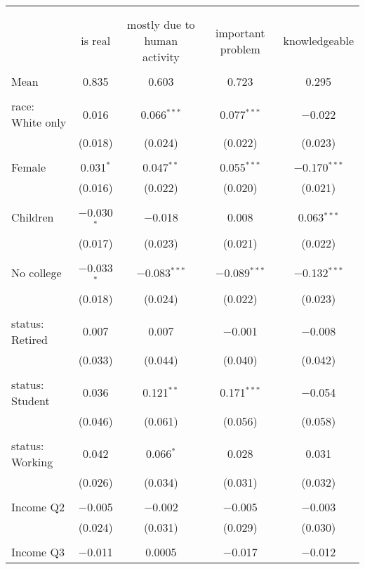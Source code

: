 
\begin{tabular}{@{\extracolsep{5pt}}lcccc} 
\\[-1.8ex]\hline 
\hline \\[-1.8ex] 
\\[-1.8ex] & is real & mostly due to human activity & important problem & knowledgeable \\ 
\hline \\[-1.8ex] 
 Mean & 0.835 & 0.603 & 0.723 & 0.295  \\ \hline \\[-1.8ex] race: White only & 0.016 & 0.066$^{***}$ & 0.077$^{***}$ & $-$0.022 \\ 
  & (0.018) & (0.024) & (0.022) & (0.023) \\ 
  & & & & \\ 
 Female & 0.031$^{*}$ & 0.047$^{**}$ & 0.055$^{***}$ & $-$0.170$^{***}$ \\ 
  & (0.016) & (0.022) & (0.020) & (0.021) \\ 
  & & & & \\ 
 Children & $-$0.030$^{*}$ & $-$0.018 & 0.008 & 0.063$^{***}$ \\ 
  & (0.017) & (0.023) & (0.021) & (0.022) \\ 
  & & & & \\ 
 No college & $-$0.033$^{*}$ & $-$0.083$^{***}$ & $-$0.089$^{***}$ & $-$0.132$^{***}$ \\ 
  & (0.018) & (0.024) & (0.022) & (0.023) \\ 
  & & & & \\ 
 status: Retired & 0.007 & 0.007 & $-$0.001 & $-$0.008 \\ 
  & (0.033) & (0.044) & (0.040) & (0.042) \\ 
  & & & & \\ 
 status: Student & 0.036 & 0.121$^{**}$ & 0.171$^{***}$ & $-$0.054 \\ 
  & (0.046) & (0.061) & (0.056) & (0.058) \\ 
  & & & & \\ 
 status: Working & 0.042 & 0.066$^{*}$ & 0.028 & 0.031 \\ 
  & (0.026) & (0.034) & (0.031) & (0.032) \\ 
  & & & & \\ 
 Income Q2 & $-$0.005 & $-$0.002 & $-$0.005 & $-$0.003 \\ 
  & (0.024) & (0.031) & (0.029) & (0.030) \\ 
  & & & & \\ 
 Income Q3 & $-$0.011 & 0.0005 & $-$0.017 & $-$0.012 \\ 

\end{tabular}
